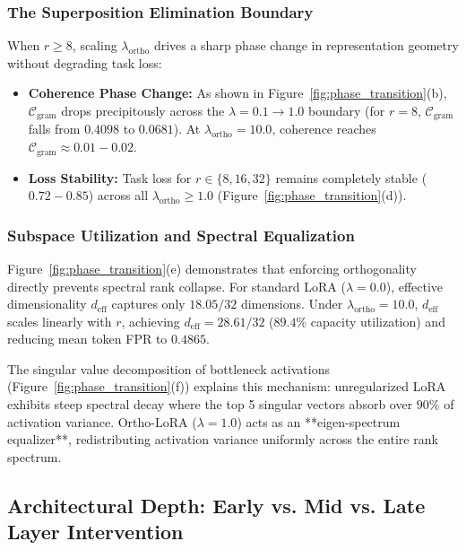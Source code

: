 \documentclass[10pt,twocolumn,letterpaper]{article}
\begin{document}
\subsubsection{The Superposition Elimination Boundary}
When $r \ge 8$, scaling $\lambda_{\text{ortho}}$ drives a sharp phase change in representation geometry without degrading task loss:
\begin{itemize}
    \item \textbf{Coherence Phase Change:} As shown in Figure~\ref{fig:phase_transition}(b), $\mathcal{C}_{\text{gram}}$ drops precipitously across the $\lambda=0.1 \to 1.0$ boundary (for $r=8$, $\mathcal{C}_{\text{gram}}$ falls from $0.4098$ to $0.0681$). At $\lambda_{\text{ortho}}=10.0$, coherence reaches $\mathcal{C}_{\text{gram}} \approx 0.01-0.02$.
    \item \textbf{Loss Stability:} Task loss for $r \in \{8, 16, 32\}$ remains completely stable ($0.72 - 0.85$) across all $\lambda_{\text{ortho}} \ge 1.0$ (Figure~\ref{fig:phase_transition}(d)).
\end{itemize}

\subsubsection{Subspace Utilization and Spectral Equalization}
Figure~\ref{fig:phase_transition}(e) demonstrates that enforcing orthogonality directly prevents spectral rank collapse. For standard LoRA ($\lambda=0.0$), effective dimensionality $d_{\text{eff}}$ captures only $18.05 / 32$ dimensions. Under $\lambda_{\text{ortho}}=10.0$, $d_{\text{eff}}$ scales linearly with $r$, achieving $d_{\text{eff}} = 28.61 / 32$ ($89.4\%$ capacity utilization) and reducing mean token FPR to $0.4865$.

The singular value decomposition of bottleneck activations (Figure~\ref{fig:phase_transition}(f)) explains this mechanism: unregularized LoRA exhibits steep spectral decay where the top 5 singular vectors absorb over $90\%$ of activation variance. Ortho-LoRA ($\lambda=1.0$) acts as an **eigen-spectrum equalizer**, redistributing activation variance uniformly across the entire rank spectrum.

\subsection{Architectural Depth: Early vs. Mid vs. Late Layer Intervention}
\label{subsec:ablation_depth}
\end{document}
